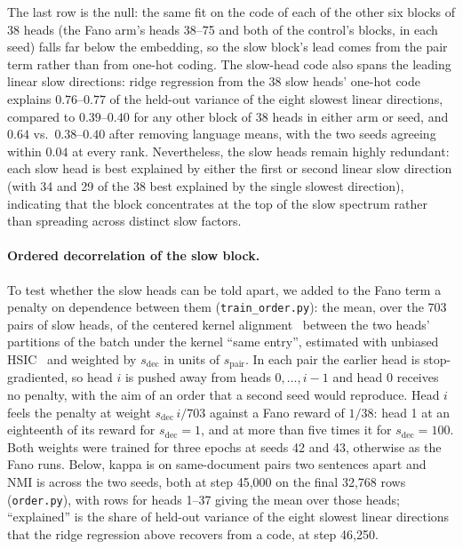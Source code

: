 \noindent The last row is the null: the same fit on the code of each of
the other six blocks of 38 heads (the Fano arm's heads 38--75 and both of
the control's blocks, in each seed) falls far below the embedding, so the
slow block's lead comes from the pair term rather than from one-hot
coding. The slow-head code also spans the leading linear slow
directions: ridge regression from the 38 slow heads' one-hot code
explains $0.76$--$0.77$ of the held-out variance of the eight slowest
linear directions, compared to $0.39$--$0.40$ for any other block of 38
heads in either arm or seed, and $0.64$ vs.\ $0.38$--$0.40$ after
removing language means, with the two seeds agreeing within $0.04$ at
every rank. Nevertheless, the slow heads remain highly redundant: each
slow head is best explained by either the first or second linear slow
direction (with 34 and 29 of the 38 best explained by the single slowest
direction), indicating that the block concentrates at the top of the slow
spectrum rather than spreading across distinct slow factors.

\paragraph{Ordered decorrelation of the slow block.}
To test whether the slow heads can be told apart, we added to the Fano
term a penalty on dependence between them (\texttt{train\_order.py}): the
mean, over the 703 pairs of slow heads, of the centered kernel
alignment~\cite{kornblith2019} between the two heads' partitions of the
batch under the kernel ``same entry'', estimated with unbiased
HSIC~\cite{song2012} and weighted by $s_{\mathrm{dec}}$ in units of
$s_{\mathrm{pair}}$. In each pair the earlier head is stop-gradiented, so
head $i$ is pushed away from heads $0,\dots,i{-}1$ and head 0 receives no
penalty, with the aim of an order that a second seed would reproduce.
Head $i$ feels the penalty at weight $s_{\mathrm{dec}}\,i/703$ against a
Fano reward of $1/38$: head 1 at an eighteenth of its reward for
$s_{\mathrm{dec}}{=}1$, and at more than five times it for
$s_{\mathrm{dec}}{=}100$. Both weights were trained for three epochs at
seeds 42 and 43, otherwise as the Fano runs. Below, kappa is on
same-document pairs two sentences apart and NMI is across the two seeds,
both at step 45{,}000 on the final 32{,}768 rows (\texttt{order.py}),
with rows for heads 1--37 giving the mean over those heads;
``explained'' is the share of held-out variance of the eight slowest
linear directions that the ridge regression above recovers from a code,
at step 46{,}250.

